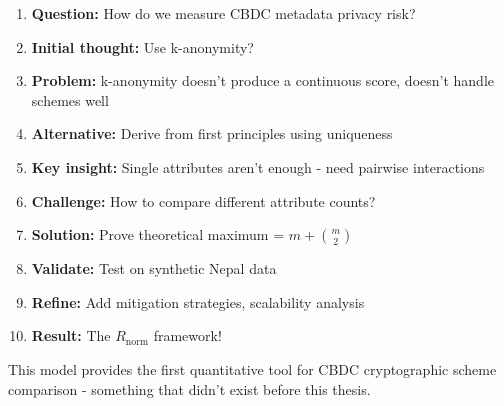 \documentclass[12pt,a4paper,oneside,openany]{report}
\begin{document}
\begin{enumerate}
    \item \textbf{Question:} How do we measure CBDC metadata privacy risk?
    \item \textbf{Initial thought:} Use k-anonymity?
    \item \textbf{Problem:} k-anonymity doesn't produce a continuous score, doesn't handle schemes well
    \item \textbf{Alternative:} Derive from first principles using uniqueness
    \item \textbf{Key insight:} Single attributes aren't enough - need pairwise interactions
    \item \textbf{Challenge:} How to compare different attribute counts?
    \item \textbf{Solution:} Prove theoretical maximum = $m + \binom{m}{2}$
    \item \textbf{Validate:} Test on synthetic Nepal data
    \item \textbf{Refine:} Add mitigation strategies, scalability analysis
    \item \textbf{Result:} The $R_{\mathrm{norm}}$ framework!
\end{enumerate}

This model provides the first quantitative tool for CBDC cryptographic scheme comparison - something that didn't exist before this thesis.
\end{document}
